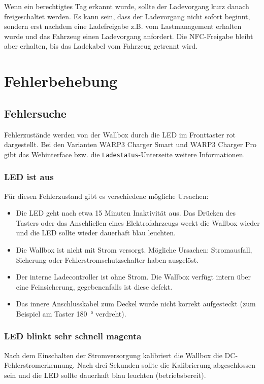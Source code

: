 \documentclass[a4paper,10pt]{article}
\begin{document}
\begin{multicols*}{2}
    Wenn ein berechtigtes Tag erkannt wurde, sollte der Ladevorgang kurz danach
    freigeschaltet werden. Es kann sein, dass der Ladevorgang nicht
    sofort beginnt, sondern erst nachdem eine Ladefreigabe z.B. vom Lastmanagement erhalten wurde
    und das Fahrzeug einen Ladevorgang anfordert. Die NFC-Freigabe bleibt aber erhalten,
    bis das Ladekabel vom Fahrzeug getrennt wird.

    \newpage
    \section{Fehlerbehebung}\label{fehlerbehebung}
    \subsection{Fehlersuche}
    Fehlerzustände werden von der Wallbox durch die LED im Fronttaster rot
    dargestellt. Bei den Varianten WARP3 Charger Smart und WARP3 Charger Pro
    gibt das Webinterface bzw. die \texttt{Ladestatus}-Unterseite
    weitere Informationen.

    \subsubsection*{LED ist aus}
    Für diesen Fehlerzustand gibt es verschiedene mögliche Ursachen:
    \begin{itemize}
        \item Die LED geht nach etwa 15 Minuten Inaktivität aus. Das Drücken des Tasters
              oder das Anschließen eines Elektrofahrzeugs weckt die Wallbox wieder
              und die LED sollte wieder dauerhaft blau leuchten.
        \item Die Wallbox ist nicht mit Strom versorgt. Mögliche Ursachen: Stromausfall,
              Sicherung oder Fehlerstrom\-schutzschalter haben ausgelöst.
        \item Der interne Ladecontroller ist ohne Strom. Die Wallbox verfügt
		intern über eine Feinsicherung, gegebenenfalls ist diese defekt.
        \item Das innere Anschlusskabel zum Deckel wurde nicht korrekt aufgesteckt (zum Beispiel am Taster \SI{180}{\degree} verdreht).
    \end{itemize}

    \subsubsection*{LED blinkt sehr schnell magenta}\label{fast_blink}
    Nach dem Einschalten der Stromversorgung kalibriert die Wallbox die
    DC-Fehlerstromerkennung. Nach drei Sekunden sollte die Kalibrierung
    abgeschlossen sein und die LED sollte dauerhaft blau leuchten
    (betriebsbereit).


\end{multicols*}
\end{document}
